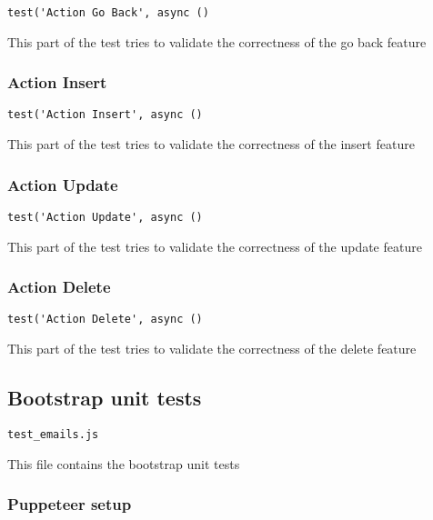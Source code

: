 \documentclass[a4paper]{article}
\begin{document}
\begin{lstlisting}
test('Action Go Back', async ()
\end{lstlisting}

This part of the test tries to validate the correctness of the go back feature

\hypertarget{toc562}{}
\subsubsection{Action Insert}

\begin{lstlisting}
test('Action Insert', async ()
\end{lstlisting}

This part of the test tries to validate the correctness of the insert feature

\hypertarget{toc563}{}
\subsubsection{Action Update}

\begin{lstlisting}
test('Action Update', async ()
\end{lstlisting}

This part of the test tries to validate the correctness of the update feature

\hypertarget{toc564}{}
\subsubsection{Action Delete}

\begin{lstlisting}
test('Action Delete', async ()
\end{lstlisting}

This part of the test tries to validate the correctness of the delete feature

\hypertarget{toc565}{}
\subsection{Bootstrap unit tests}

\begin{lstlisting}
test_emails.js
\end{lstlisting}

This file contains the bootstrap unit tests

\hypertarget{toc566}{}
\subsubsection{Puppeteer setup}
\end{document}

